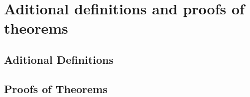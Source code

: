 \chapter{Aditional definitions and proofs of theorems}
\label{cha:conclusions}

\begin{ChapAbstract}
\end{ChapAbstract}


\section{Aditional Definitions}


\section{Proofs of Theorems}